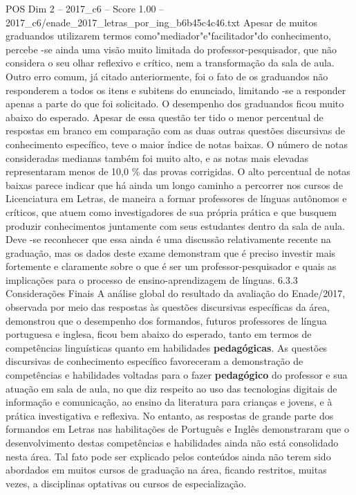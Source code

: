 \begin{textsample}{POS Dim 2 – 2017\_c6 – Score 1.00 – 2017\_c6/enade\_2017\_letras\_por\_ing\_b6b45c4c46.txt}
Apesar de muitos graduandos utilizarem termos como"mediador"e"facilitador"do conhecimento, percebe -se ainda uma visão muito limitada do professor-pesquisador, que não considera o seu olhar reflexivo e crítico, nem a transformação da sala de aula.
Outro erro comum, já citado anteriormente, foi o fato de os graduandos não responderem a todos os itens e subitens do enunciado, limitando -se a responder apenas a parte do que foi solicitado.
O desempenho dos graduandos ficou muito abaixo do esperado.
Apesar de essa questão ter tido o menor percentual de respostas em branco em comparação com as duas outras questões discursivas de conhecimento específico, teve o maior índice de notas baixas.
O número de notas consideradas medianas também foi muito alto, e as notas mais elevadas representaram menos de 10,0 \% das provas corrigidas.
O alto percentual de notas baixas parece indicar que há ainda um longo caminho a percorrer nos cursos de Licenciatura em Letras, de maneira a formar professores de línguas autônomos e críticos, que atuem como investigadores de sua própria prática e que busquem produzir conhecimentos juntamente com seus estudantes dentro da sala de aula.
Deve -se reconhecer que essa ainda é uma discussão relativamente recente na graduação, mas os dados deste exame demonstram que é preciso investir mais fortemente e claramente sobre o que é ser um professor-pesquisador e quais as implicações para o processo de ensino-aprendizagem de línguas. 6.3.3 Considerações Finais A análise global do resultado da avaliação do Enade/2017, observada por meio das respostas às questões discursivas específicas da área, demonstrou que o desempenho dos formandos, futuros professores de língua portuguesa e inglesa, ficou bem abaixo do esperado, tanto em termos de competências linguísticas quanto em habilidades \textbf{pedagógicas}.
As questões discursivas de conhecimento específico favoreceram a demonstração de competências e habilidades voltadas para o fazer \textbf{pedagógico} do professor e sua atuação em sala de aula, no que diz respeito ao uso das tecnologias digitais de informação e comunicação, ao ensino da literatura para crianças e jovens, e à prática investigativa e reflexiva.
No entanto, as respostas de grande parte dos formandos em Letras nas habilitações de Português e Inglês demonstraram que o desenvolvimento destas competências e habilidades ainda não está consolidado nesta área.
Tal fato pode ser explicado pelos conteúdos ainda não terem sido abordados em muitos cursos de graduação na área, ficando restritos, muitas vezes, a disciplinas optativas ou cursos de especialização.

\end{textsample}
